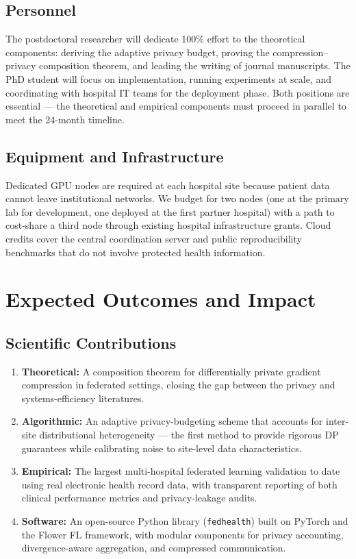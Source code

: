 \documentclass[11pt,a4paper]{article}
\begin{document}
{\subsection{Personnel}

The postdoctoral researcher will dedicate 100\% effort to the theoretical components:
deriving the adaptive privacy budget, proving the compression--privacy composition theorem,
and leading the writing of journal manuscripts. The PhD student will focus on
implementation, running experiments at scale, and coordinating with hospital IT teams for
the deployment phase. Both positions are essential — the theoretical and empirical
components must proceed in parallel to meet the 24-month timeline.

\subsection{Equipment and Infrastructure}

Dedicated GPU nodes are required at each hospital site because patient data cannot leave
institutional networks. We budget for two nodes (one at the primary lab for development,
one deployed at the first partner hospital) with a path to cost-share a third node through
existing hospital infrastructure grants. Cloud credits cover the central coordination server
and public reproducibility benchmarks that do not involve protected health information.


\section{Expected Outcomes and Impact}

\subsection{Scientific Contributions}

\begin{enumerate}[leftmargin=*,label={\color{accent}\bfseries\arabic*.}]
  \item \textbf{Theoretical:} A composition theorem for differentially private gradient
    compression in federated settings, closing the gap between the privacy and
    systems-efficiency literatures.
  \item \textbf{Algorithmic:} An adaptive privacy-budgeting scheme that accounts for
    inter-site distributional heterogeneity — the first method to provide rigorous DP
    guarantees while calibrating noise to site-level data characteristics.
  \item \textbf{Empirical:} The largest multi-hospital federated learning validation to date
    using real electronic health record data, with transparent reporting of both clinical
    performance metrics and privacy-leakage audits.
  \item \textbf{Software:} An open-source Python library (\texttt{fedhealth}) built on
    PyTorch and the Flower FL framework, with modular components for privacy accounting,
    divergence-aware aggregation, and compressed communication.
\end{enumerate}

}
\end{document}
